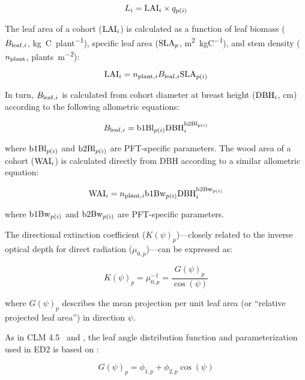 \begin{equation}
  \label{eqn:elai}
  L_{i} = \mathrm{LAI}_{i} \times q_{p(i)}
\end{equation}

The leaf area of a cohort ($\mathrm{LAI}_{i}$) is calculated as a function of leaf biomass ($B_{\mathrm{leaf}, i}$, \unit{kg C ~ plant^{-1}}), specific leaf area ($\mathrm{SLA}_{p}$, \unit{m^2 ~ kgC^{-1}}), and stem density ($n_{\mathrm{plant}}$, \unit{plants ~ m^{-2}}):

\begin{equation}
  \mathrm{LAI}_{i} = n_{\mathrm{plant}, i} B_{\mathrm{leaf}, i} \mathrm{SLA}_{p(i)}
\end{equation}

In turn, $B_{\mathrm{leaf}, i}$ is calculated from cohort diameter at breast height ($\mathrm{DBH}_{i}$, \unit{cm}) according to the following allometric equations:

\begin{equation}
  B_{\mathrm{leaf}, i} = \mathrm{b1Bl}_{p(i)} \mathrm{DBH}_{i}^{\mathrm{b2Bl}_{p(i)}}
\end{equation}

where $\mathrm{b1Bl}_{p(i)}$ and $\mathrm{b2Bl}_{p(i)}$ are PFT-specific parameters.
The wood area of a cohort ($\mathrm{WAI}_{i}$) is calculated directly from DBH according to a similar allometric equation:

\begin{equation}
  \mathrm{WAI}_{i} = n_{\mathrm{plant}, i} \mathrm{b1Bw}_{p(i)} \mathrm{DBH}_{i}^{\mathrm{b2Bw}_{p(i)}}
\end{equation}

where $\mathrm{b1Bw}_{p(i)}$ and $\mathrm{b2Bw}_{p(i)}$ are PFT-specific parameters.

The directional extinction coefficient ($K(\psi)_p$)---closely related to the inverse optical depth for direct radiation ($\mu_{0,p}$)---can be expressed as:

\begin{equation}
  K(\psi)_p = \mu_{0,p}^{-1} = \frac{G(\psi)_{p}}{\cos(\psi)}
\end{equation}

where $G(\psi)_{p}$ describes the mean projection per unit leaf area (or ``relative projected leaf area'') in direction $\psi$.

As in CLM 4.5~\citep{clm45_note} and \citet{sellers1985canopy}, the leaf angle distribution function and parameterization used in ED2 is based on \citet{goudriaan_1977_crop}:

\begin{equation}
  G(\psi)_{p} = \phi_{1,p} + \phi_{2,p} \cos(\psi)
\end{equation}

